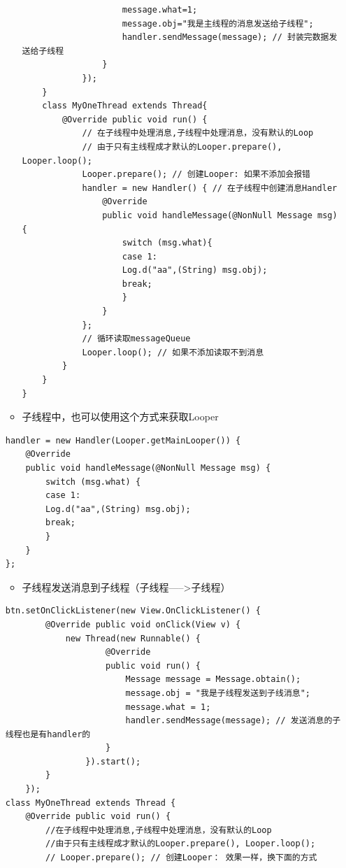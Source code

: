 \documentclass[9pt, b5paper]{article}
\begin{document}
\begin{enumerate}
\begin{itemize}
\begin{verbatim}
                    message.what=1;
                    message.obj="我是主线程的消息发送给子线程";
                    handler.sendMessage(message); // 封装完数据发送给子线程
                }
            });
    }
    class MyOneThread extends Thread{
        @Override public void run() {
            // 在子线程中处理消息,子线程中处理消息，没有默认的Loop
            // 由于只有主线程成才默认的Looper.prepare(), Looper.loop();
            Looper.prepare(); // 创建Looper: 如果不添加会报错
            handler = new Handler() { // 在子线程中创建消息Handler
                @Override
                public void handleMessage(@NonNull Message msg) {
                    switch (msg.what){
                    case 1:
                    Log.d("aa",(String) msg.obj);
                    break;
                    }
                }
            };
            // 循环读取messageQueue
            Looper.loop(); // 如果不添加读取不到消息
        }
    }
}
\end{verbatim}
\item 子线程中，也可以使用这个方式来获取Looper
\end{itemize}
\begin{verbatim}
handler = new Handler(Looper.getMainLooper()) {
    @Override
    public void handleMessage(@NonNull Message msg) {
        switch (msg.what) {
        case 1:
        Log.d("aa",(String) msg.obj);
        break;
        }
    }
};
\end{verbatim}
\begin{itemize}
\item 子线程发送消息到子线程（子线程----->子线程）
\end{itemize}
\begin{verbatim}
btn.setOnClickListener(new View.OnClickListener() {
        @Override public void onClick(View v) {
            new Thread(new Runnable() {
                    @Override
                    public void run() {
                        Message message = Message.obtain();
                        message.obj = "我是子线程发送到子线消息";
                        message.what = 1;
                        handler.sendMessage(message); // 发送消息的子线程也是有handler的
                    }
                }).start();
        }
    });
class MyOneThread extends Thread {
    @Override public void run() {
        //在子线程中处理消息,子线程中处理消息，没有默认的Loop
        //由于只有主线程成才默认的Looper.prepare(), Looper.loop();
        // Looper.prepare(); // 创建Looper： 效果一样，换下面的方式

\end{verbatim}
\end{enumerate}
\end{document}
